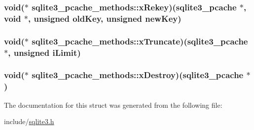 \hypertarget{structsqlite3__pcache__methods_dc5552190f1de86eb95d91e9cf8430e6}{
\subsubsection[xRekey]{\setlength{\rightskip}{0pt plus 5cm}void($\ast$ {\bf sqlite3\_\-pcache\_\-methods::xRekey})({\bf sqlite3\_\-pcache} $\ast$, void $\ast$, unsigned oldKey, unsigned newKey)}}
\label{structsqlite3__pcache__methods_dc5552190f1de86eb95d91e9cf8430e6}


\hypertarget{structsqlite3__pcache__methods_ad73f9335999770bcd2dc6a2d914b4f0}{
\subsubsection[xTruncate]{\setlength{\rightskip}{0pt plus 5cm}void($\ast$ {\bf sqlite3\_\-pcache\_\-methods::xTruncate})({\bf sqlite3\_\-pcache} $\ast$, unsigned iLimit)}}
\label{structsqlite3__pcache__methods_ad73f9335999770bcd2dc6a2d914b4f0}


\hypertarget{structsqlite3__pcache__methods_ac18fc581d8d63550a6657016c24ba5d}{
\subsubsection[xDestroy]{\setlength{\rightskip}{0pt plus 5cm}void($\ast$ {\bf sqlite3\_\-pcache\_\-methods::xDestroy})({\bf sqlite3\_\-pcache} $\ast$)}}
\label{structsqlite3__pcache__methods_ac18fc581d8d63550a6657016c24ba5d}




The documentation for this struct was generated from the following file:\begin{CompactItemize}
\item 
include/\hyperlink{sqlite3_8h}{sqlite3.h}\end{CompactItemize}
